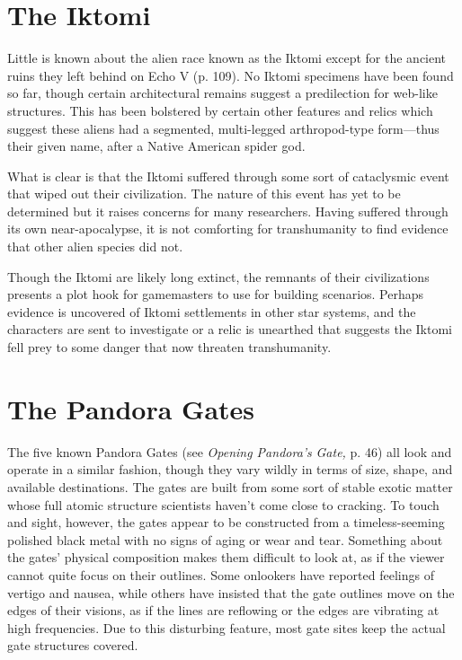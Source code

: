 \section{The Iktomi}

Little is known about the alien race known as the 
Iktomi except for the ancient ruins they left behind 
on Echo V (p. 109). No Iktomi specimens have been 
found so far, though certain architectural remains 
suggest a predilection for web-like structures. This 
has been bolstered by certain other features and relics 
which suggest these aliens had a segmented, multi-legged
arthropod-type form—thus their given name,
after a Native American spider god.

What is clear is that the Iktomi suffered through 
some sort of cataclysmic event that wiped out their 
civilization. The nature of this event has yet to be determined
but it raises concerns for many researchers.
Having suffered through its own near-apocalypse, it 
is not comforting for transhumanity to find evidence 
that other alien species did not.

Though the Iktomi are likely long extinct, the remnants
of their civilizations presents a plot hook for
gamemasters to use for building scenarios. Perhaps 
evidence is uncovered of Iktomi settlements in other 
star systems, and the characters are sent to investigate 
or a relic is unearthed that suggests the Iktomi fell 
prey to some danger that now threaten transhumanity. 

\section{The Pandora Gates}

The five known Pandora Gates (see \textit{Opening Pandora's }
\textit{Gate,} p. 46) all look and operate in a similar fashion, 
though they vary wildly in terms of size, shape, and 
available destinations. The gates are built from some 
sort of stable exotic matter whose full atomic structure
scientists haven't come close to cracking. To touch
and sight, however, the gates appear to be constructed 
from a timeless-seeming polished black metal with no 
signs of aging or wear and tear. Something about the 
gates' physical composition makes them difficult to 
look at, as if the viewer cannot quite focus on their 
outlines. Some onlookers have reported feelings of 
vertigo and nausea, while others have insisted that the 
gate outlines move on the edges of their visions, as if 
the lines are reflowing or the edges are vibrating at 
high frequencies. Due to this disturbing feature, most 
gate sites keep the actual gate structures covered.

